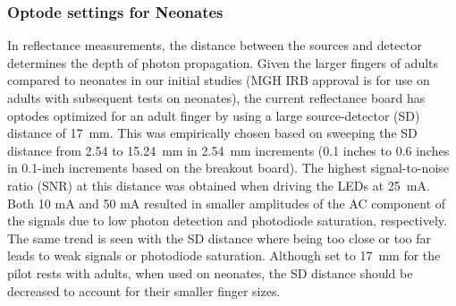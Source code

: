 \subsubsection{Optode settings for Neonates}
In reflectance measurements, the distance between the sources and detector determines the depth of photon propagation. Given the larger fingers of adults compared to neonates in our initial studies (MGH IRB approval is for use on adults with subsequent tests on neonates), the current reflectance board has optodes optimized for an adult finger by using a large source-detector (SD) distance of 17~mm. This was empirically chosen based on sweeping the SD distance from 2.54 to 15.24~mm in 2.54~mm increments (0.1 inches to 0.6 inches in 0.1-inch increments based on the breakout board). The highest signal-to-noise ratio (SNR) at this distance was obtained when driving the LEDs at 25~mA. Both 10 mA and 50 mA resulted in smaller amplitudes of the AC component of the signals due to low photon detection and photodiode saturation, respectively. The same trend is seen with the SD distance where being too close or too far leads to weak signals or photodiode saturation. Although set to 17~mm for the pilot rests with adults, when used on neonates, the SD distance should be decreased to account for their smaller finger sizes. 

